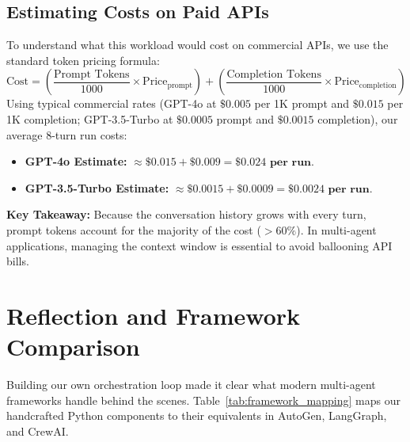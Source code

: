 \documentclass[11pt,a4paper]{article}
\begin{document}
\subsection{Estimating Costs on Paid APIs}
To understand what this workload would cost on commercial APIs, we use the standard token pricing formula:
\begin{equation}
\text{Cost} = \left(\frac{\text{Prompt Tokens}}{1000} \times \text{Price}_{\text{prompt}}\right) + \left(\frac{\text{Completion Tokens}}{1000} \times \text{Price}_{\text{completion}}\right)
\end{equation}
Using typical commercial rates (GPT-4o at $\$0.005$ per 1K prompt and $\$0.015$ per 1K completion; GPT-3.5-Turbo at $\$0.0005$ prompt and $\$0.0015$ completion), our average 8-turn run costs:
\begin{itemize}
    \item \textbf{GPT-4o Estimate:} $\approx \$0.015 + \$0.009 = \mathbf{\$0.024 \text{ per run}}$.
    \item \textbf{GPT-3.5-Turbo Estimate:} $\approx \$0.0015 + \$0.0009 = \mathbf{\$0.0024 \text{ per run}}$.
\end{itemize}
\textbf{Key Takeaway:} Because the conversation history grows with every turn, prompt tokens account for the majority of the cost ($>60\%$). In multi-agent applications, managing the context window is essential to avoid ballooning API bills.

\section{Reflection and Framework Comparison}

Building our own orchestration loop made it clear what modern multi-agent frameworks handle behind the scenes. Table~\ref{tab:framework_mapping} maps our handcrafted Python components to their equivalents in AutoGen, LangGraph, and CrewAI.
\end{document}
